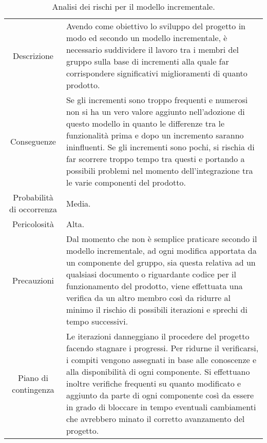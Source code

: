 \begin{table}[H]
	\begin{tabular}{|c|p{11.5cm}|}
		\rowcolor{darkblue} \hline
		\multicolumn{2}{|c|}{\textcolor{white}{\textbf{RO3 - Modello incrementale}}}\\ \hline
		Descrizione & Avendo come obiettivo lo sviluppo del progetto in modo \glo{efficace} ed \glo{efficiente} secondo un modello incrementale, è necessario suddividere il lavoro tra i membri del gruppo sulla base di incrementi alla quale far corrispondere significativi miglioramenti di quanto prodotto.\\ \hline
		Conseguenze & Se gli incrementi sono troppo frequenti e numerosi non si ha un vero valore aggiunto nell'adozione di questo modello in quanto le differenze tra le funzionalità prima e dopo un incremento saranno ininfluenti. Se gli incrementi sono pochi, si rischia di far scorrere troppo tempo tra questi e portando a possibili problemi nel momento dell'integrazione tra le varie componenti del prodotto.\\ \hline
		Probabilità di occorrenza & Media.\\ \hline
		Pericolosità & Alta.\\ \hline
		Precauzioni & Dal momento che non è semplice praticare secondo il modello incrementale, ad ogni modifica apportata da un componente del gruppo, sia questa relativa ad un qualsiasi documento o riguardante codice per il funzionamento del prodotto, viene effettuata una verifica da un altro membro così da ridurre al minimo il rischio di possibili iterazioni e sprechi di tempo successivi.\\ \hline
		Piano di contingenza & Le iterazioni danneggiano il procedere del progetto facendo stagnare i progressi. Per ridurne il verificarsi, i compiti vengono assegnati in base alle conoscenze e alla disponibilità di ogni componente. Si effettuano inoltre verifiche frequenti su quanto modificato e aggiunto da parte di ogni componente così da essere in grado di bloccare in tempo eventuali cambiamenti che avrebbero minato il corretto avanzamento del progetto.\\ \hline
	\end{tabular}
	\caption{\label{tab:RO3}Analisi dei rischi per il modello incrementale.}
\end{table}